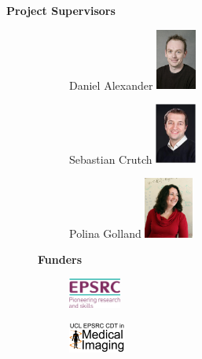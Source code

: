 \documentclass[8pt,xcolor=table]{beamer}
\begin{document}
\begin{frame}[label=current]
\begin{small}
\begin{columns}[T]
    
    \begin{column}{.6\textwidth}
    \begin{center}
    \textbf{Project Supervisors}
    \end{center}
    \vspace{-2em}
      \begin{figure}
      \begin{subfigure}{0.3\textwidth}
      \centering
      Daniel Alexander
      \includegraphics[height=2cm]{Danny-Alexander.jpeg}  
      \end{subfigure}
	\begin{subfigure}{0.3\textwidth}
	\centering
      Sebastian Crutch
      \includegraphics[height=2cm]{Seb_Crutch_photo.JPG}  
      \end{subfigure}
  \begin{subfigure}{0.3\textwidth}
	\centering
      Polina Golland
      \includegraphics[height=2cm, trim=0 00 0 0,clip]{polina}  
      \end{subfigure}
      
    \begin{center}
    \textbf{Funders}
    \end{center}
      \begin{subfigure}{0.3\textwidth}
      \centering
      \includegraphics[height=1cm]{epsrc_logo}  
      \end{subfigure}
	\begin{subfigure}{0.3\textwidth}
	\centering
      \includegraphics[height=1cm]{CDTlogo}  
      \end{subfigure}
     

\end{figure}
\end{column}
\end{columns}
\end{small}
\end{frame}
\end{document}
